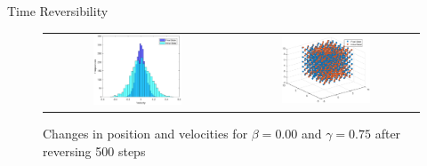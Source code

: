 \documentclass{beamer}
\begin{document}
\begin{frame}{Time Reversibility}
 {
	\begin{figure}
		\centering
 		\begin{tabular}{@{}cc@{}}
			\includegraphics[width=0.5\textwidth]{time_reversible_b0,0g0,75_1000_velocity_histogram.eps} &
    			\includegraphics[width=0.5\textwidth]{time_reversible_b0,0g0,75_1000_position_overlay.eps} \\
		\end{tabular}
  		\caption{Changes in position and velocities for $\beta = 0.00$ and $\gamma = 0.75$ after reversing 500 steps}
		\label{fig:time_reversible_b0.00g0.75_1000}
	\end{figure}
}


\end{frame}
\end{document}
